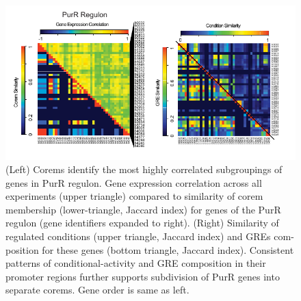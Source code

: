 \begin{figure}[h!]
    \centering
    \includegraphics[width=\textwidth]{figures/purR_heatmap}
 	\caption[Corems model the mechanistic basis for conditional subdivision of the PurR regulon, \textit{E. coli.}]{(Left) Corems identify the most highly correlated subgroupings of genes in PurR regulon. Gene expression correlation across all experiments (upper triangle) compared to similarity of corem membership (lower-triangle, Jaccard index) for genes of the PurR regulon (gene identifiers expanded to right). (Right) Similarity of regulated conditions (upper triangle, Jaccard index) and GREs com- position for these genes (bottom triangle, Jaccard index). Consistent patterns of conditional-activity and GRE composition in their promoter regions further supports subdivision of PurR genes into separate corems. Gene order is same as left.
}
    \label{fig:purR_heatmap}
\end{figure}

